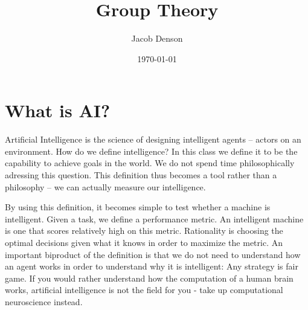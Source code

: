 \documentclass{report}
\title{Group Theory}
\author{Jacob Denson}
\date{\today}
\makeatletter
\def\printauthor{%
    {\large \@author}}
\newcommand\titlepagedecoration{%
\begin{tikzpicture}[remember picture,overlay,shorten >= -10pt]

\coordinate (aux1) at ([yshift=-15pt]current page.north east);
\coordinate (aux2) at ([yshift=-410pt]current page.north east);
\coordinate (aux3) at ([xshift=-4.5cm]current page.north east);
\coordinate (aux4) at ([yshift=-150pt]current page.north east);

\begin{scope}[titlepagecolor!40,line width=12pt,rounded corners=12pt]
\draw
  (aux1) -- coordinate (a)
  ++(225:5) --
  ++(-45:5.1) coordinate (b);
\draw[shorten <= -10pt]
  (aux3) --
  (a) --
  (aux1);
\draw[opacity=0.6,titlepagecolor,shorten <= -10pt]
  (b) --
  ++(225:2.2) --
  ++(-45:2.2);
\end{scope}
\draw[titlepagecolor,line width=8pt,rounded corners=8pt,shorten <= -10pt]
  (aux4) --
  ++(225:0.8) --
  ++(-45:0.8);
\begin{scope}[titlepagecolor!70,line width=6pt,rounded corners=8pt]
\draw[shorten <= -10pt]
  (aux2) --
  ++(225:3) coordinate[pos=0.45] (c) --
  ++(-45:3.1);
\draw
  (aux2) --
  (c) --
  ++(135:2.5) --
  ++(45:2.5) --
  ++(-45:2.5) coordinate[pos=0.3] (d);   
\draw 
  (d) -- +(45:1);
\end{scope}
\end{tikzpicture}%
}
\makeatother
\begin{document}

\chapter{What is AI?}

Artificial Intelligence is the science of designing intelligent agents -- actors on an environment. How do we define intelligence? In this class we define it to be the capability to achieve goals in the world. We do not spend time philosophically adressing this question. This definition thus becomes a tool rather than a philosophy -- we can actually measure our intelligence.

By using this definition, it becomes simple to test whether a machine is intelligent. Given a task, we define a performance metric. An intelligent machine is one that scores relatively high on this metric. Rationality is choosing the optimal decisions given what it knows in order to maximize the metric. An important biproduct of the definition is that we do not need to understand how an agent works in order to understand why it is intelligent: Any strategy is fair game. If you would rather understand how the computation of a human brain works, artificial intelligence is not the field for you - take up computational neuroscience instead.
\end{document}
